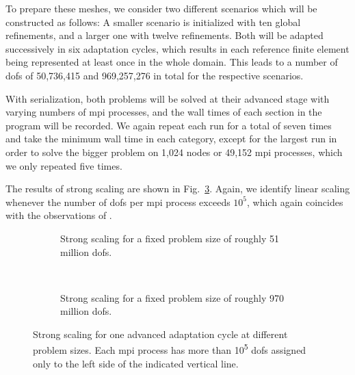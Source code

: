 To prepare these meshes, we consider two different scenarios which will be constructed as follows: A smaller scenario is initialized with ten global refinements, and a larger one with twelve refinements. Both will be adapted successively in six adaptation cycles, which results in each reference finite element being represented at least once in the whole domain. This leads to a number of \glspl{dof} of 50,736,415 and 969,257,276 in total for the respective scenarios.

With serialization, both problems will be solved at their advanced stage with varying numbers of \gls{mpi} processes, and the wall times of each section in the program will be recorded. We again repeat each run for a total of seven times and take the minimum wall time in each category, except for the largest run in order to solve the bigger problem on 1,024 nodes or 49,152 \gls{mpi} processes, which we only repeated five times. %

The results of strong scaling are shown in Fig.~\ref{fig:strong}.
Again, we identify linear scaling whenever the number of \glspl{dof} per \gls{mpi} process exceeds $10^5$, which again coincides with the observations of \textcite{bangerth2012}.

\begin{figure}
\begin{subfigure}{1\textwidth}
  \centering
  
  \caption{Strong scaling for a fixed problem size of roughly 51 million \glspl{dof}.}
  \label{fig:strong-nrefs10}
\end{subfigure}
\vspace{1em} \\
\begin{subfigure}{1\textwidth}
  \centering
  
  \caption{Strong scaling for a fixed problem size of roughly 970 million \glspl{dof}.}
  \label{fig:strong-nrefs12}
\end{subfigure}
\caption[Strong scaling for one advanced adaptation cycle at different problem sizes.]{Strong scaling for one advanced adaptation cycle at different problem sizes. Each \gls{mpi} process has more than 10\textsuperscript{5} \glspl{dof} assigned only to the left side of the indicated vertical line.}
\label{fig:strong}
\end{figure}